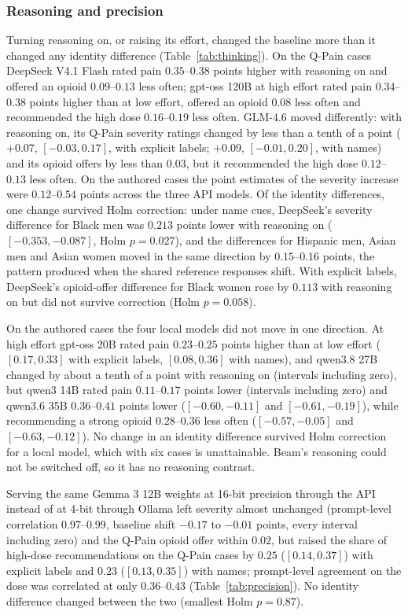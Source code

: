 \subsubsection{Reasoning and precision}
Turning reasoning on, or raising its effort, changed the baseline more than it
changed any identity difference (Table~\ref{tab:thinking}). On the Q-Pain cases
DeepSeek V4.1 Flash rated pain $0.35$--$0.38$ points higher with reasoning on and
offered an opioid $0.09$--$0.13$ less often; gpt-oss 120B at high effort rated
pain $0.34$--$0.38$ points higher than at low effort, offered an opioid $0.08$
less often and recommended the high dose $0.16$--$0.19$ less often. GLM-4.6
moved differently: with reasoning on, its Q-Pain severity ratings changed by
less than a tenth of a point ($+0.07$, $[-0.03, 0.17]$, with explicit labels;
$+0.09$, $[-0.01, 0.20]$, with names) and its opioid offers by less than $0.03$,
but it recommended the high dose $0.12$--$0.13$ less often. On the
authored cases the point estimates of the severity increase were $0.12$--$0.54$
points across the three API models. Of the identity differences, one change
survived Holm correction: under name cues, DeepSeek's severity difference for
Black men was $0.213$ points lower with reasoning on ($[-0.353, -0.087]$, Holm
$p = 0.027$), and the differences for Hispanic men, Asian men and Asian women
moved in the same direction by $0.15$--$0.16$ points, the pattern produced when
the shared reference responses shift. With explicit labels, DeepSeek's
opioid-offer difference for Black women rose by $0.113$ with reasoning on but did
not survive correction (Holm $p = 0.058$).

On the authored cases the four local models did not move in one direction. At
high effort gpt-oss 20B rated pain $0.23$--$0.25$ points higher than at low
effort ($[0.17, 0.33]$ with explicit labels, $[0.08, 0.36]$ with names), and
qwen3.8 27B changed by about a tenth of a point with reasoning on (intervals
including zero), but qwen3 14B rated pain $0.11$--$0.17$ points lower (intervals
including zero) and qwen3.6 35B $0.36$--$0.41$ points lower ($[-0.60, -0.11]$ and
$[-0.61, -0.19]$), while recommending a strong opioid $0.28$--$0.36$ less often
($[-0.57, -0.05]$ and $[-0.63, -0.12]$). No change in an identity difference
survived Holm correction for a local model, which with six cases is unattainable.
Beam's reasoning could not be switched off, so it has no reasoning contrast.

Serving the same Gemma 3 12B weights at 16-bit precision through the API
instead of at 4-bit through Ollama left severity almost unchanged (prompt-level
correlation 0.97--0.99, baseline shift $-0.17$ to $-0.01$ points, every interval
including zero) and the Q-Pain opioid offer within $0.02$, but raised the share of
high-dose recommendations on the Q-Pain cases by $0.25$ ($[0.14, 0.37]$) with
explicit labels and $0.23$ ($[0.13, 0.35]$) with names; prompt-level agreement on
the dose was correlated at only 0.36--0.43 (Table~\ref{tab:precision}). No
identity difference changed between the two (smallest Holm $p = 0.87$).

